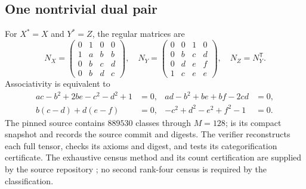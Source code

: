 \subsection{One nontrivial dual pair}
For $X^*=X$ and $Y^*=Z$, the regular matrices are
\[
N_X=\begin{pmatrix}0&1&0&0\\1&a&b&b\\0&b&c&d\\0&b&d&c\end{pmatrix},\quad
N_Y=\begin{pmatrix}0&0&1&0\\0&b&c&d\\0&d&e&f\\1&c&e&e\end{pmatrix},\quad
N_Z=N_Y^{\mathsf T}.
\]
Associativity is equivalent to
\begin{align*}
 ac-b^2+2be-c^2-d^2+1&=0,&ad-b^2+be+bf-2cd&=0,\\
 b(c-d)+d(e-f)&=0,&-c^2+d^2-e^2+f^2-1&=0.
\end{align*}
The pinned source contains $889530$ classes through $M=128$;
 is its compact snapshot and
 records the source commit and digests.
The verifier reconstructs each full tensor, checks its axioms and digest,
and tests its categorification certificate. The exhaustive census method
and its count certification are supplied by the source repository
\cite{Census}; no second rank-four census is required by the classification.
